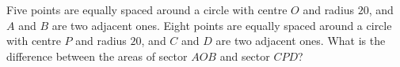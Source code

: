 Five points are equally spaced around a circle with centre $O$ and radius $20$, and $A$ and $B$ are two adjacent ones. Eight points are equally spaced around a circle with centre $P$ and radius $20$, and $C$ and $D$ are two adjacent ones. What is the difference between the areas of sector $AOB$ and sector $CPD$?
